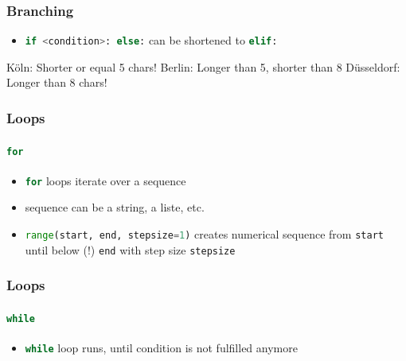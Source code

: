 \documentclass[ngerman]{beamer}
\newcommand{\ta}[1]{\textattachfile[color=1 0 0]{#1}{Code}}
\begin{document}
\begin{frame}[containsverbatim]
\frametitle{Branching}

\begin{itemize}
\item \lstinline[language={Python}]{if <condition>: else:} can be shortened to \lstinline[language={Python}]{elif:} 
\end{itemize}



\begin{ausgabe}
Köln: Shorter or equal 5 chars!
Berlin: Longer than 5, shorter than 8
Düsseldorf: Longer than 8 chars!
\end{ausgabe}


\end{frame}


\begin{frame}[containsverbatim]
\frametitle{Loops}
\framesubtitle{\lstinline[language={Python}]{for}}

\begin{itemize}
\item \lstinline[language={Python}]{for} loops iterate over a sequence
\item sequence can be a string, a liste, etc. 
\item \lstinline[language={Python}]{range(start, end, stepsize=1)} creates numerical sequence from \texttt{start} until below (!) \texttt{end} with step size \texttt{stepsize}
\end{itemize}



\end{frame}


\begin{frame}[containsverbatim]
\frametitle{Loops}
\framesubtitle{\lstinline[language={Python}]{while}}

\begin{itemize}
\item \lstinline[language={Python}]{while} loop runs, until condition is not fulfilled anymore
\end{itemize}



\end{frame}
\end{document}
